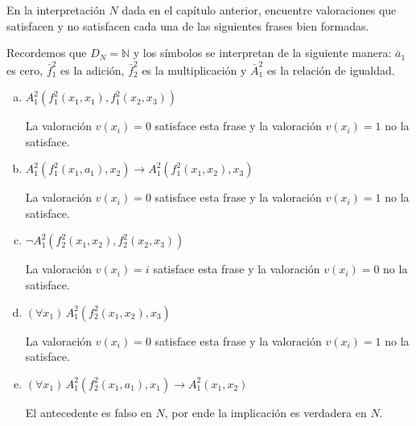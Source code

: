 \setcounter{exercise}{13}
\begin{exercise}
En la interpretación $N$ dada en el capítulo anterior, encuentre valoraciones que satisfacen y no satisfacen cada una de las siguientes frases bien formadas.
\end{exercise}

\begin{remark}
Recordemos que $D_N = \mathbb N$ y los símbolos se interpretan de la siguiente manera: $\bar a_1$ es cero, $\bar f_1^2$ es la adición, $\bar f_2^2$ es la multiplicación y $\bar A_1^2$ es la relación de igualdad.
\end{remark}

\begin{enumerate}[(a)]
    \item $A_1^2(f_1^2(x_1, x_1), f_1^2(x_2, x_3))$
    \begin{solution}
    La valoración $v(x_i) = 0$ satisface esta frase y la valoración $v(x_i) = 1$ no la satisface.
    \end{solution}
    
    \item $A_1^2(f_1^2(x_1, a_1), x_2) \to A_1^2(f_1^2(x_1, x_2), x_3)$
    \begin{solution}
    La valoración $v(x_i) = 0$ satisface esta frase y la valoración $v(x_i) = 1$ no la satisface.
    \end{solution}
    
    \item $\neg A_1^2(f_2^2(x_1, x_2), f_2^2(x_2, x_3))$
    \begin{solution}
    La valoración $v(x_i) = i$ satisface esta frase y la valoración $v(x_i) = 0$ no la satisface.
    \end{solution}
    
    \item $(\forall x_1) \, A_1^2(f_2^2(x_1, x_2), x_3)$
    \begin{solution}
    La valoración $v(x_i) = 0$ satisface esta frase y la valoración $v(x_i) = 1$ no la satisface.
    \end{solution}
    
    \item $(\forall x_1) \, A_1^2(f_2^2(x_1, a_1), x_1) \to A_1^2(x_1, x_2)$
    \begin{solution}
    El antecedente es falso en $N$, por ende la implicación es verdadera en $N$.
    \end{solution}
\end{enumerate}

